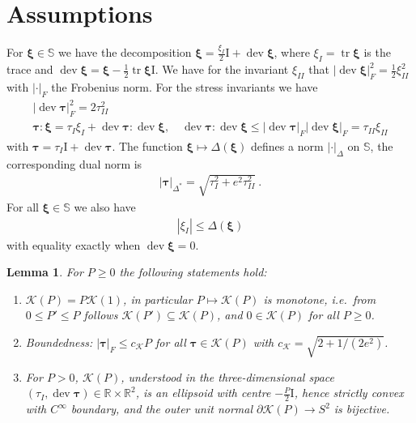 \documentclass{article}
\newtheorem{lemma}[theorem]{Lemma}
\theoremstyle{definition}
\newcommand{\bftau}{\boldsymbol{\tau}}
\newcommand{\bfxi}{\boldsymbol{\xi}}
\newcommand{\bfI}{\boldsymbol{\mathrm{I}}}
\newcommand{\K}{\mathcal{K}}
\DeclareMathOperator{\tr}{tr}
\DeclareMathOperator{\dev}{dev}
\begin{document}
\section{Assumptions}
For $\bfxi \in \mathbb S$ we have the decomposition $\bfxi = \frac{\xi_I}{2}\bfI + \dev \bfxi$, where $\xi_I = \tr \bfxi$ is the trace and $\dev\bfxi = \bfxi- \frac{1}{2}\tr \bfxi \bfI$. We have for the invariant $\xi_{II}$ that $|\dev \bfxi |_F^2 = \frac{1}{2}\xi_{II}^2$
with $|\cdot|_F$ the Frobenius norm. For the stress invariants we have
\begin{align*}
    |\dev\bftau|_F^2 = 2 \tau_{II}^2  \\
    \bftau : \bfxi = \tau_I \xi_I + \dev\bftau : \dev\bfxi, \quad
    \dev\bftau : \dev \bfxi \leq |\dev \bftau|_F |\dev \bfxi|_F = \tau_{II} \xi_{II}
\end{align*}
with $\bftau = \tau_I \bfI + \dev\bftau$. The function $\bfxi \mapsto\Delta(\bfxi)$ defines a norm $|\cdot|_\Delta$ on $\mathbb S$, the corresponding
dual norm is
\begin{align*}
    |\bftau|_{\Delta^*} = \sqrt{\tau_I^2 + e^2\tau_{II}^2} \ .
\end{align*}
For all $\bfxi\in\mathbb S$ we also have
\begin{align}
    |\xi_I| \leq \Delta(\bfxi) \label{eq:xi_estimate}
\end{align}
with equality exactly when $\dev \bfxi = 0$.

\begin{lemma} \label{lema:prop_K}
    For $P\geq 0$ the following statements hold:
    \begin{enumerate}
        \item $\K(P) = P \K(1)$, in particular $P\mapsto \K(P)$ is monotone, i.e.\ from $0\leq P' \leq P$ follows $\K(P') \subseteq \K(P)$, and $0\in \K(P)$ for all $P\geq 0$.
        \item Boundedness: $|\bftau |_F \leq c_\K P$ for all $\bftau \in \K(P)$ with $c_\K = \sqrt{2+1/(2e^2)}$.
        \item For $P>0$, $\K(P)$, understood in the three-dimensional space $(\tau_I, \dev\bftau) \in \mathbb R \times \mathbb R^2$, is an ellipsoid with centre $-\frac{P}{2} \bfI$, hence strictly convex with $C^\infty$ boundary, and the outer unit normal $\partial \K(P) \rightarrow S^2$ is bijective.
    \end{enumerate}
\end{lemma}
\end{document}
